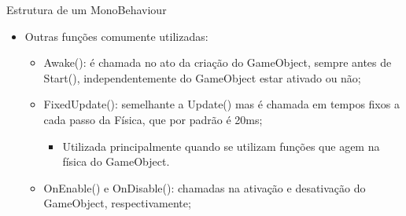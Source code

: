 \documentclass{beamer}
\begin{document}
\begin{frame}[fragile]{Estrutura de um MonoBehaviour}
	\begin{itemize}
		\item Outras funções comumente utilizadas:
		\begin{itemize}
			\item Awake(): é chamada no ato da criação do GameObject, sempre antes de Start(), independentemente do GameObject estar ativado ou não;
			\item FixedUpdate(): semelhante a Update() mas é chamada em tempos fixos a cada passo da Física, que por padrão é 20ms;
			\begin{itemize}
				\item Utilizada principalmente quando se utilizam funções que agem na física do GameObject.
			\end{itemize}
			\item OnEnable() e OnDisable(): chamadas na ativação e desativação do GameObject, respectivamente;
		\end{itemize}
	\end{itemize}
\end{frame}
\end{document}
